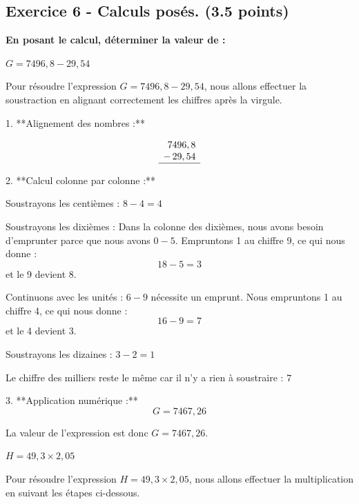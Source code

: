 \documentclass[answers]{exam}
\begin{document}
\subsection*{Exercice 6 - Calculs posés. (3.5 points)}

\textbf{En posant le calcul, déterminer la valeur de :}
\begin{questions}
  \question[1] $G = 7496,8 - 29,54$
  

\begin{solution}
Pour résoudre l'expression \( G = 7496,8 - 29,54 \), nous allons effectuer la soustraction en alignant correctement les chiffres après la virgule.

1. **Alignement des nombres :**

   \[
   \begin{array}{r}
       7496,8 \\
   - \, 29,54 \\
   \hline
   \end{array}
   \]

2. **Calcul colonne par colonne :**
   \begin{compactitem}
       \item Soustrayons les centièmes : \( 8 - 4 = 4 \)
       \item Soustrayons les dixièmes : Dans la colonne des dixièmes, nous avons besoin d'emprunter parce que nous avons \( 0 - 5 \). Empruntons 1 au chiffre 9, ce qui nous donne :
       \[
       18 - 5 = 3
       \]
       et le 9 devient 8.
       \item Continuons avec les unités : \( 6 - 9 \) nécessite un emprunt. Nous empruntons 1 au chiffre 4, ce qui nous donne :
       \[
       16 - 9 = 7
       \]
       et le 4 devient 3.
       \item Soustrayons les dizaines : \( 3 - 2 = 1 \)
       \item Le chiffre des milliers reste le même car il n'y a rien à soustraire : \( 7 \)
   \end{compactitem}

3. **Application numérique :**
   \[
   G = 7467,26
   \]

La valeur de l'expression est donc \( G = \boxed{7467,26} \).
\end{solution}

\question[1.5] $H = 49,3 \times 2,05$
  

\begin{solution}
Pour résoudre l'expression \( H = 49,3 \times 2,05 \), nous allons effectuer la multiplication en suivant les étapes ci-dessous.


\end{solution}
\end{questions}
\end{document}
